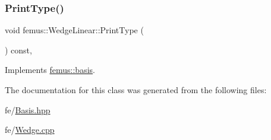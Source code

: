 \mbox{\label{classfemus_1_1_wedge_linear_a0f4d7583a8442ee5019cf63b70a3eb26}} 
\subsubsection{\texorpdfstring{Print\+Type()}{PrintType()}}
{\footnotesize\ttfamily void femus\+::\+Wedge\+Linear\+::\+Print\+Type (\begin{DoxyParamCaption}{ }\end{DoxyParamCaption}) const\hspace{0.3cm}{\ttfamily [inline]}, {\ttfamily [virtual]}}



Implements \mbox{\hyperlink{classfemus_1_1basis_abbae7bf8f31ec5793c911bc6d4ea0572}{femus\+::basis}}.



The documentation for this class was generated from the following files\+:\begin{DoxyCompactItemize}
\item 
fe/\mbox{\hyperlink{_basis_8hpp}{Basis.\+hpp}}\item 
fe/\mbox{\hyperlink{_wedge_8cpp}{Wedge.\+cpp}}\end{DoxyCompactItemize}
